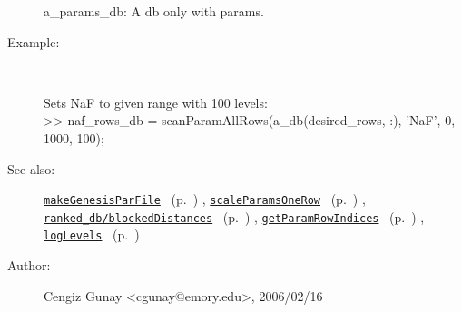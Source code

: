 \begin{description}
	a\_params\_db: A db only with params.
%
\item[Example:]~
\begin{lyxcode} Sets NaF to given range with 100 levels:\\%
 >> naf\_rows\_db = scanParamAllRows(a\_db(desired\_rows, :), 'NaF', 0, 1000, 100);\\%
\end{lyxcode}
%
\item[See also:]%
\hyperlink{ref_makeGenesisParFile}{\texttt{makeGenesisParFile}}%
\ (p.~\pageref{ref_makeGenesisParFile})%
%
, \hyperlink{ref_scaleParamsOneRow}{\texttt{scaleParamsOneRow}}%
\ (p.~\pageref{ref_scaleParamsOneRow})%
%
, \hyperlink{ref_ranked_db__blockedDistances}{\texttt{ranked\_db/blockedDistances}}%
\ (p.~\pageref{ref_ranked_db__blockedDistances})%
%
, \hyperlink{ref_getParamRowIndices}{\texttt{getParamRowIndices}}%
\ (p.~\pageref{ref_getParamRowIndices})%
%
, \hyperlink{ref_logLevels}{\texttt{logLevels}}%
\ (p.~\pageref{ref_logLevels})%
%
%
\item[Author:]%
Cengiz Gunay <cgunay@emory.edu>, 2006/02/16%
\end{description}
\methodline%
